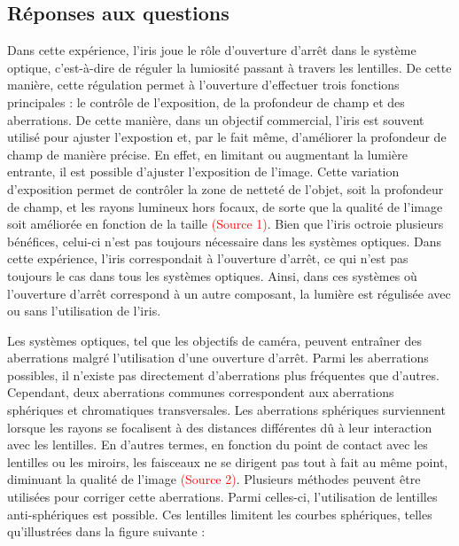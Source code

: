 \documentclass[11pt,letterpaper]{article}
\begin{document}
\subsection{Réponses aux questions}
Dans cette expérience, l'iris joue le rôle d'ouverture d'arrêt dans le système optique, c'est-à-dire de réguler la lumiosité passant à travers les lentilles. De cette manière, cette régulation permet à l'ouverture d'effectuer trois fonctions principales : le contrôle de l'exposition, de la profondeur de champ et des aberrations. De cette manière, dans un objectif commercial, l'iris est souvent utilisé pour ajuster l'expostion et, par le fait même, d'améliorer la profondeur de champ de manière précise. En effet, en limitant ou augmentant la lumière entrante, il est possible d'ajuster l'exposition de l'image. Cette variation d'exposition permet de contrôler la zone de netteté de l'objet, soit la profondeur de champ, et les rayons lumineux hors focaux, de sorte que la qualité de l'image soit améliorée en fonction de la taille \textcolor{red}{(Source 1)}. Bien que l'iris octroie plusieurs bénéfices, celui-ci n'est pas toujours nécessaire dans les systèmes optiques. Dans cette expérience, l'iris correspondait à l'ouverture d'arrêt, ce qui n'est pas toujours le cas dans tous les systèmes optiques. Ainsi, dans ces systèmes où l'ouverture d'arrêt correspond à un autre composant, la lumière est régulisée avec ou sans l'utilisation de l'iris.

Les systèmes optiques, tel que les objectifs de caméra, peuvent entraîner des aberrations malgré l'utilisation d'une ouverture d'arrêt. Parmi les aberrations possibles, il n'existe pas directement d'aberrations plus fréquentes que d'autres. Cependant, deux aberrations communes correspondent aux aberrations sphériques et chromatiques transversales. Les aberrations sphériques surviennent lorsque les rayons se focalisent à des distances différentes dû à leur interaction avec les lentilles. En d'autres termes, en fonction du point de contact avec les lentilles ou les miroirs, les faisceaux ne se dirigent pas tout à fait au même point, diminuant la qualité de l'image \textcolor{red}{(Source 2)}. Plusieurs méthodes peuvent être utilisées pour corriger cette aberrations. Parmi celles-ci, l'utilisation de lentilles anti-sphériques est possible. Ces lentilles limitent les courbes sphériques, telles qu'illustrées dans la figure suivante :
\end{document}

